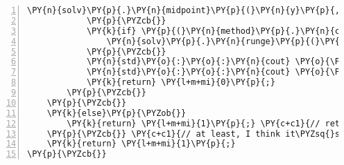\begin{Verbatim}[commandchars=\\\{\},numbers=left,firstnumber=1,stepnumber=1]
				\PY{n}{solv}\PY{p}{.}\PY{n}{midpoint}\PY{p}{(}\PY{n}{y}\PY{p}{,} \PY{n}{f}\PY{p}{,} \PY{n}{j}\PY{p}{)}\PY{p}{;}
			\PY{p}{\PYZcb{}}
			\PY{k}{if} \PY{p}{(}\PY{n}{method}\PY{p}{.}\PY{n}{compare}\PY{p}{(}\PY{l+s}{\PYZdq{}}\PY{l+s}{runge\PYZhy{}kutta}\PY{l+s}{\PYZdq{}}\PY{p}{)} \PY{o}{=}\PY{o}{=} \PY{l+m+mi}{0}\PY{p}{)}\PY{p}{\PYZob{}}
				\PY{n}{solv}\PY{p}{.}\PY{n}{runge}\PY{p}{(}\PY{n}{y}\PY{p}{,} \PY{n}{f}\PY{p}{,} \PY{n}{j}\PY{p}{)}\PY{p}{;}
			\PY{p}{\PYZcb{}}
			\PY{n}{std}\PY{o}{:}\PY{o}{:}\PY{n}{cout} \PY{o}{\PYZlt{}}\PY{o}{\PYZlt{}} \PY{l+s}{\PYZdq{}}\PY{l+s}{y(x): }\PY{l+s}{\PYZdq{}} \PY{o}{\PYZlt{}}\PY{o}{\PYZlt{}} \PY{n}{y}\PY{p}{[}\PY{l+m+mi}{0}\PY{p}{]} \PY{o}{\PYZlt{}}\PY{o}{\PYZlt{}} \PY{n}{std}\PY{o}{:}\PY{o}{:}\PY{n}{endl}\PY{p}{;} 
			\PY{n}{std}\PY{o}{:}\PY{o}{:}\PY{n}{cout} \PY{o}{\PYZlt{}}\PY{o}{\PYZlt{}} \PY{l+s}{\PYZdq{}}\PY{l+s}{y\PYZsq{}(x): }\PY{l+s}{\PYZdq{}} \PY{o}{\PYZlt{}}\PY{o}{\PYZlt{}} \PY{n}{y}\PY{p}{[}\PY{l+m+mi}{1}\PY{p}{]} \PY{o}{\PYZlt{}}\PY{o}{\PYZlt{}} \PY{n}{std}\PY{o}{:}\PY{o}{:}\PY{n}{endl}\PY{p}{;}
			\PY{k}{return} \PY{l+m+mi}{0}\PY{p}{;}
		\PY{p}{\PYZcb{}}
	\PY{p}{\PYZcb{}}
	\PY{k}{else}\PY{p}{\PYZob{}}
		\PY{k}{return} \PY{l+m+mi}{1}\PY{p}{;} \PY{c+c1}{// return 1 after unexpected input, as per unix rules}
	\PY{p}{\PYZcb{}} \PY{c+c1}{// at least, I think it\PYZsq{}s a unix thing}
	\PY{k}{return} \PY{l+m+mi}{1}\PY{p}{;}
\PY{p}{\PYZcb{}}
\end{Verbatim}
